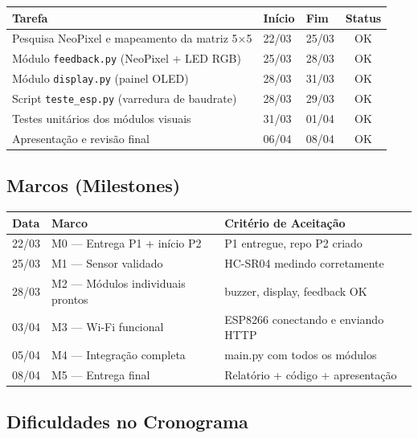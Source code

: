 \documentclass[12pt, a4paper]{article}
\begin{document}
\begin{table}[H]
\centering
\begin{tabular}{lllc}
  \toprule
  \textbf{Tarefa} & \textbf{Início} & \textbf{Fim} & \textbf{Status} \\
  \midrule
  Pesquisa NeoPixel e mapeamento da matriz 5$\times$5 & 22/03 & 25/03 & OK \\
  Módulo \texttt{feedback.py} (NeoPixel + LED RGB) & 25/03 & 28/03 & OK \\
  Módulo \texttt{display.py} (painel OLED) & 28/03 & 31/03 & OK \\
  Script \texttt{teste\_esp.py} (varredura de baudrate) & 28/03 & 29/03 & OK \\
  Testes unitários dos módulos visuais & 31/03 & 01/04 & OK \\
  Apresentação e revisão final & 06/04 & 08/04 & OK \\
  \bottomrule
\end{tabular}
\end{table}

\subsection{Marcos (Milestones)}

\begin{table}[H]
\centering
\begin{tabular}{lll}
  \toprule
  \textbf{Data} & \textbf{Marco} & \textbf{Critério de Aceitação} \\
  \midrule
  22/03 & M0 --- Entrega P1 + início P2 & P1 entregue, repo P2 criado \\
  25/03 & M1 --- Sensor validado & HC-SR04 medindo corretamente \\
  28/03 & M2 --- Módulos individuais prontos & buzzer, display, feedback OK \\
  03/04 & M3 --- Wi-Fi funcional & ESP8266 conectando e enviando HTTP \\
  05/04 & M4 --- Integração completa & main.py com todos os módulos \\
  08/04 & M5 --- Entrega final & Relatório + código + apresentação \\
  \bottomrule
\end{tabular}
\end{table}

\subsection{Dificuldades no Cronograma}
\end{document}
